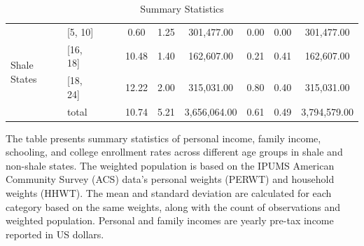 \begin{table}[ht]
\begin{tabular}{l|l||c|c|ccc|ccc}
   \multirow{4}{*}{Shale States}& [5, 10] &  &  & 0.60 & 1.25 & 301,477.00 & 0.00 & 0.00 & 301,477.00 \\ 
   & [16, 18] &  &  & 10.48 & 1.40 & 162,607.00 & 0.21 & 0.41 & 162,607.00 \\ 
   & [18, 24] &  &  & 12.22 & 2.00 & 315,031.00 & 0.80 & 0.40 & 315,031.00 \\ 
   & total &  &  & 10.74 & 5.21 & 3,656,064.00 & 0.61 & 0.49 & 3,794,579.00 \\ 
   \hline
\end{tabular}
\caption{Summary Statistics} 
\begin{minipage}{18cm}
  \scriptsize
  The table presents summary statistics of personal income, family income, schooling, and college enrollment rates across different age groups in shale and non-shale states. The weighted population is based on the IPUMS American Community Survey (ACS) data's personal weights (PERWT) and household weights (HHWT). 
  The mean and standard deviation are calculated for each category based on the same weights, along with the count of observations and weighted population.
  Personal and family incomes are yearly pre-tax income reported in US dollars.
\end{minipage}
\label{tab:sum_stat}
\end{table}
